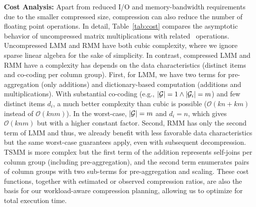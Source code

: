 \textbf{Cost Analysis:} Apart from reduced I/O and memory-bandwidth requirements due to the smaller compressed size, compression can also reduce the number of floating point operations. In detail, Table~\ref{tab:cost} compares the asymptotic behavior of uncompressed matrix multiplications with related \name \ operations. Uncompressed LMM and RMM have both cubic complexity, where we ignore sparse linear algebra for the sake of simplicity. In contrast, compressed LMM and RMM have a complexity has depends on the data characteristics (distinct items and co-coding per column group). First, for LMM, we have two terms for pre-aggregation (only additions) and dictionary-based computation (additions and multiplications). With substantial co-coding (e.g., $\lvert \mathcal{G}\rvert=1 \wedge \lvert \mathcal{G}_i\rvert=m$) and few distinct items $d_i$, a much better complexity than cubic is possible ($\mathcal{O}(kn + km)$ instead of $\mathcal{O}(knm)$). In the worst-case, $\lvert \mathcal{G}\rvert=m$ and $d_i=n$, which gives $\mathcal{O}(knm)$ but with a higher constant factor. Second, RMM has only the second term of LMM and thus, we already benefit with less favorable data characteristics but the same worst-case guarantees apply, even with subsequent decompression. TSMM is more complex but the first term of the addition represents self-joins per column group (including pre-aggregation), and the second term enumerates pairs of column groups with two sub-terms for pre-aggregation and scaling. These cost functions, together with estimated or observed compression ratios, are also the basis for our workload-aware compression planning, allowing us to optimize for total execution time.

